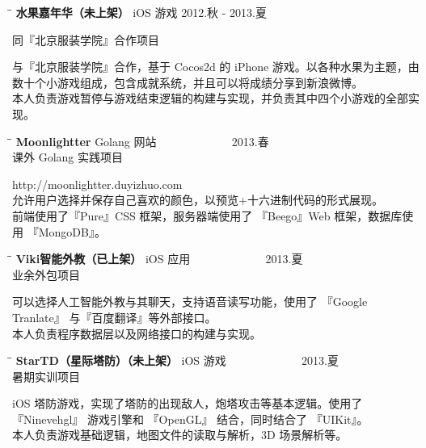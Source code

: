 \documentclass{res}
\begin{document}
\begin{resume}
    \begin{tabbing}
      \hspace{2.3in}\= \hspace{2.6in}\= \kill %
      {\bf 水果嘉年华（未上架）} \>  iOS 游戏  \> 2012.秋 - 2013.夏\\
                          \centerline{同『北京服装学院』合作项目}
    \end{tabbing}\vspace{-20pt}      %
    与『北京服装学院』合作，基于 Cocos2d 的 iPhone 游戏。以各种水果为主题，由数十个小游戏组成，包含成就系统，并且可以将成绩分享到新浪微博。\\
    本人负责游戏暂停与游戏结束逻辑的构建与实现，并负责其中四个小游戏的全部实现。

    \begin{tabbing}
      \hspace{2.3in}\= \hspace{2.6in}\= \kill %
      {\bf Moonlightter} \>   Golang 网站  \> ~~~~~~~~~~~~ 2013.春\\
                          \>课外 Golang 实践项目
    \end{tabbing}\vspace{-20pt}      %
    http://moonlightter.duyizhuo.com\\
    允许用户选择并保存自己喜欢的颜色，以预览+十六进制代码的形式展现。\\
    前端使用了『Pure』CSS 框架，服务器端使用了 『Beego』Web 框架，数据库使用 『MongoDB』。

    \begin{tabbing}
      \hspace{2.3in}\= \hspace{2.6in}\= \kill %
      {\bf Viki智能外教（已上架）} \>  iOS 应用  \> ~~~~~~~~~~~~ 2013.夏\\
                          \>业余外包项目
    \end{tabbing}\vspace{-20pt}      %
    可以选择人工智能外教与其聊天，支持语音读写功能，使用了 『Google Tranlate』 与『百度翻译』等外部接口。\\
    本人负责程序数据层以及网络接口的构建与实现。

    \begin{tabbing}
      \hspace{2.3in}\= \hspace{2.6in}\= \kill %
      {\bf StarTD（星际塔防）（未上架）} \>  iOS 游戏  \> ~~~~~~~~~~~~ 2013.夏\\
                          \>暑期实训项目
    \end{tabbing}\vspace{-20pt}      %
    iOS 塔防游戏，实现了塔防的出现敌人，炮塔攻击等基本逻辑。使用了 『Ninevehgl』 游戏引擎和 『OpenGL』 结合，同时结合了 『UIKit』。\\
    本人负责游戏基础逻辑，地图文件的读取与解析，3D 场景解析等。


\end{resume}
\end{document}
